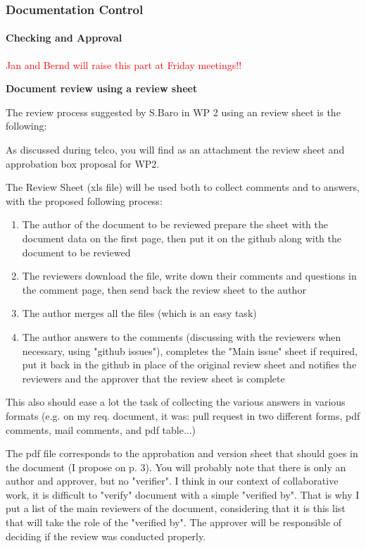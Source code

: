 \documentclass{template/openetcs_article}
\begin{document}
\subsubsection{Documentation Control}

\paragraph{Checking and Approval}
\textcolor{red}{Jan and Bernd will raise this part at Friday meetings!!}

\textbf{Document review using a review sheet}

The review process suggested by S.Baro in WP 2 using an review sheet is the following:

As discussed during telco, you will find as an attachment the review sheet and approbation box proposal for WP2. 
 
The Review Sheet (xls file) will be used both to collect comments and to answers, with the proposed following process:
\begin{enumerate}
\item The author of the document to be reviewed prepare the sheet with the document data on the first page, then put it on the github along with the document to be reviewed 
\item The reviewers download the file, write down their comments and questions in the comment page, then send back the review sheet to the author 
\item The author merges all the files (which is an easy task)
\item The author answers to the comments (discussing with the reviewers when necessary, using "github issues"), completes the "Main issue" sheet if required, put it back in the github in place of the original review sheet and notifies the reviewers and the approver that the review sheet is complete 
\end{enumerate}	
This also should ease a lot the task of collecting the various answers in various formats (e.g. on my req. document, it was: pull request in two different forms, pdf comments, mail comments, and pdf table...)
 
The pdf file corresponds to the approbation and version sheet that should goes in the document (I propose on p. 3). You will probably note that there is only an author and approver, but no "verifier". I think in our context of collaborative work, it is difficult to "verify" document with a simple "verified by". That is why I put a list of the main reviewers of the document, considering that it is this list that will take the role of the "verified by". The approver will be responsible of deciding if the review was conducted properly.
\end{document}
